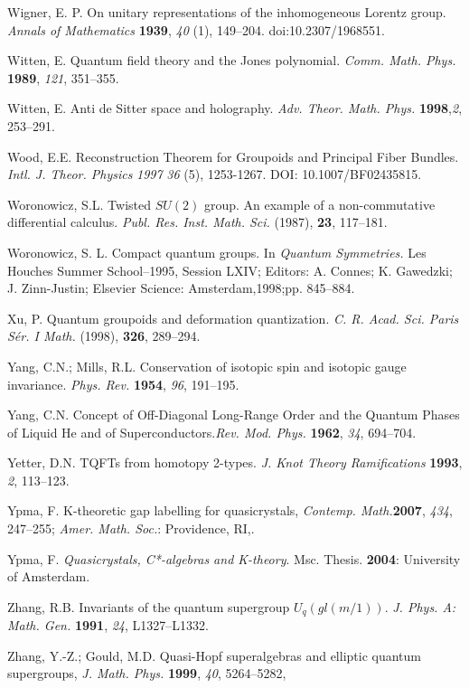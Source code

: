 \documentclass[12pt]{article}
\theoremstyle{plain}
\theoremstyle{definition}
\numberwithin{equation}{section}
\begin{document}
\begin{thebibliography}{199}
Wigner, E. P.  On unitary representations of the inhomogeneous Lorentz group. {\em Annals of Mathematics} {\bf 1939}, {\em 40} (1), 149--204. doi:10.2307/1968551.

Witten, E. Quantum field theory and the Jones polynomial. {\em Comm. Math. Phys.} {\bf 1989}, {\em 121}, 351--355.

Witten, E. Anti de Sitter space and holography. {\em Adv. Theor. Math. Phys.} {\bf 1998},{\em 2}, 253--291. 

Wood, E.E. Reconstruction Theorem for Groupoids and Principal Fiber Bundles. {\em Intl. J. Theor. Physics} {\em 1997} {\em 36} (5), 1253-1267.  DOI: 10.1007/BF02435815. 

Woronowicz, S.L. Twisted $SU(2)$ group. An example of a non-commutative differential calculus. \emph{Publ. Res. Inst. Math. Sci. } (1987), {\bf 23},
117--181.

Woronowicz, S. L. Compact quantum groups. In \emph{Quantum Symmetries.}  Les Houches Summer School--1995, Session LXIV; Editors: A. Connes; K. Gawedzki; J. Zinn-Justin; Elsevier Science: Amsterdam,1998;pp. 845--884.

Xu, P. Quantum groupoids and deformation quantization. \emph{C. R. Acad. Sci. Paris S\'{e}r. I Math.} (1998), {\bf 326}, 289--294.  %

Yang, C.N.; Mills, R.L. Conservation of isotopic spin and isotopic gauge invariance. {\em Phys. Rev.} {\bf 1954}, {\em 96}, 191--195.

Yang, C.N. Concept of Off-Diagonal Long-Range Order and the Quantum Phases of Liquid He and of Superconductors.{\em Rev. Mod. Phys.} {\bf 1962}, {\em 34}, 694--704.

Yetter, D.N. TQFTs from homotopy 2-types. \textit{J. Knot Theory Ramifications} {\bf 1993}, {\em 2}, 113--123.

Ypma, F.  K-theoretic gap labelling for quasicrystals, {\em Contemp. Math.}{\bf 2007}, {\em 434}, 247--255; \emph{Amer. Math. Soc.}: Providence, RI,.

Ypma, F. {\em Quasicrystals, C*-algebras and K-theory}. Msc. Thesis. {\bf 2004}: University of Amsterdam.

Zhang, R.B. Invariants of the quantum supergroup $U_q(gl(m/1))$. {\em J. Phys. A: Math. Gen.} {\bf 1991}, {\em 24}, L1327--L1332.

Zhang, Y.-Z.; Gould,  M.D. Quasi-Hopf superalgebras and elliptic quantum supergroups, \emph{J. Math. Phys.} {\bf 1999}, {\em 40}, 5264--5282,


\end{thebibliography}

\end{document}
